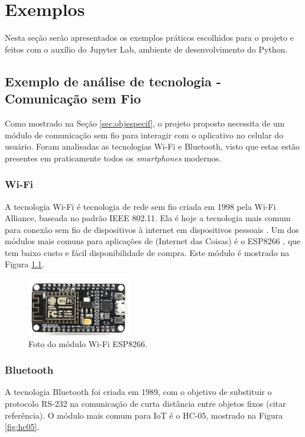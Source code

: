\chapter{Exemplos}

Nesta seção serão apresentados os exemplos práticos escolhidos para o projeto e feitos com o auxílio do Jupyter Lab, ambiente de desenvolvimento do Python.

\section{Exemplo de análise de tecnologia - Comunicação sem Fio}
\label{sec:exemplo}
Como mostrado na Seção \ref{sec:objespecif}, o projeto proposto necessita de um módulo de comunicação sem fio para interagir com o aplicativo no celular do usuário. Foram analisadas as tecnologias Wi-Fi e Bluetooth, visto que estas estão presentes em praticamente todos os \textit{smartphones} modernos.

\subsection{Wi-Fi}
\label{sec:wifi}

A tecnologia Wi-Fi é tecnologia de rede sem fio criada em 1998 pela Wi-Fi Alliance, baseada no padrão IEEE 802.11. Ela é hoje a tecnologia mais comum para conexão sem fio de dispositivos à internet em dispositivos pessoais \cite{WiFi2020}. Um dos módulos mais comuns para aplicações de  (Internet das Coisas) é o ESP8266 \cite{datasheet8266}, que tem baixo custo e fácil disponibilidade de compra. Este módulo é mostrado na Figura \ref{fig:esp8266}.

\begin{figure}[!htb]
	\centering
	\includegraphics[width=0.4\textwidth]{./esp8266.png} 
	\caption{Foto do módulo Wi-Fi ESP8266.}
	\label{fig:esp8266}
\end{figure}

\subsection{Bluetooth}
\label{sec:bt}
A tecnologia Bluetooth foi criada em 1989, com o objetivo de substituir o protocolo RS-232 na comunicação de curta distância entre objetos fixos (citar referência). O módulo mais comum para IoT é o HC-05, mostrado na Figura \ref{fig:hc05}.

